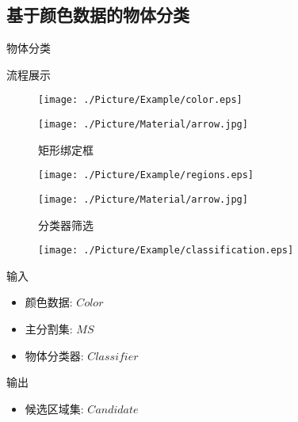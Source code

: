 \documentclass[xcolor=table,notheorems,compress,blue]{beamer}
\begin{document}
  \subsection{基于颜色数据的物体分类}
	\begin{frame}{物体分类}
		\begin{exampleblock}{流程展示}
			\begin{figure}[htpb]
				\centering
				\begin{minipage}[b]{0.8in}
					\centerline{ \texttt{[image: ./Picture/Example/color.eps]} }
				\end{minipage}
				\begin{minipage}[b]{0.8in}
					\centerline{ \texttt{[image: ./Picture/Material/arrow.jpg]} }
					\centerline{\tiny{矩形绑定框}}
				\end{minipage}
				\begin{minipage}[b]{0.8in}
					\centerline{ \texttt{[image: ./Picture/Example/regions.eps]} }
				\end{minipage}
				\begin{minipage}[b]{0.8in}
					\centerline{ \texttt{[image: ./Picture/Material/arrow.jpg]} }
					\centerline{\tiny{分类器筛选}}
				\end{minipage}
				\begin{minipage}[b]{0.8in}
					\centerline{ \texttt{[image: ./Picture/Example/classification.eps]} }
				\end{minipage}
			\end{figure}
		\end{exampleblock}
		\begin{exampleblock}{输入}
			\begin{itemize}		
				\item 颜色数据: $Color$	
				\item 主分割集: $MS$ 
				\item 物体分类器: ${Classifier}$
			\end{itemize}
		\end{exampleblock}
		\begin{exampleblock}{输出}
			\begin{itemize}
				\item 候选区域集: $Candidate$
			\end{itemize}
		\end{exampleblock}
	\end{frame}
	
\end{document}
